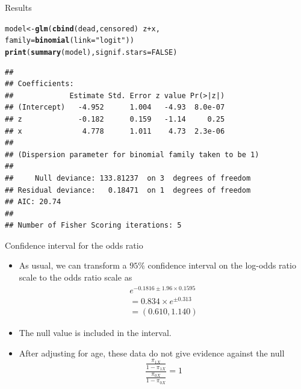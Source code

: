 \documentclass[10pt]{beamer}\usepackage[]{graphicx}\usepackage[]{color}
\makeatletter
\newcommand{\hlnum}[1]{\textcolor[rgb]{0.686,0.059,0.569}{#1}}%
\newcommand{\hlstr}[1]{\textcolor[rgb]{0.192,0.494,0.8}{#1}}%
\newcommand{\hlopt}[1]{\textcolor[rgb]{0,0,0}{#1}}%
\newcommand{\hlstd}[1]{\textcolor[rgb]{0.345,0.345,0.345}{#1}}%
\newcommand{\hlkwb}[1]{\textcolor[rgb]{0.69,0.353,0.396}{#1}}%
\newcommand{\hlkwc}[1]{\textcolor[rgb]{0.333,0.667,0.333}{#1}}%
\newcommand{\hlkwd}[1]{\textcolor[rgb]{0.737,0.353,0.396}{\textbf{#1}}}%
\newenvironment{kframe}{%
 \def\at@end@of@kframe{}%
 \ifinner\ifhmode%
  \def\at@end@of@kframe{\end{minipage}}%
  \begin{minipage}{\columnwidth}%
 \fi\fi%
 \def\FrameCommand##1{\hskip\@totalleftmargin \hskip-\fboxsep
 \colorbox{shadecolor}{##1}\hskip-\fboxsep
     \hskip-\linewidth \hskip-\@totalleftmargin \hskip\columnwidth}%
 \MakeFramed {\advance\hsize-\width
   \@totalleftmargin\z@ \linewidth\hsize
   \@setminipage}}%
 {\par\unskip\endMakeFramed%
 \at@end@of@kframe}
\newenvironment{knitrout}{}{} %
\makeatother
\begin{document}
\begin{frame}[fragile]{Results}
\begin{knitrout}
\color{fgcolor}\begin{kframe}
\begin{alltt}
\hlstd{model} \hlkwb{<-} \hlkwd{glm}\hlstd{(}\hlkwd{cbind}\hlstd{(dead,censored)} \hlopt{~} \hlstd{z} \hlopt{+} \hlstd{x,}
              \hlkwc{family}\hlstd{=}\hlkwd{binomial}\hlstd{(}\hlkwc{link}\hlstd{=}\hlstr{"logit"}\hlstd{))}
\hlkwd{print}\hlstd{(}\hlkwd{summary}\hlstd{(model),} \hlkwc{signif.stars} \hlstd{=} \hlnum{FALSE}\hlstd{)}
\end{alltt}
\begin{verbatim}
## 
## Coefficients:
##             Estimate Std. Error z value Pr(>|z|)
## (Intercept)   -4.952      1.004   -4.93  8.0e-07
## z             -0.182      0.159   -1.14     0.25
## x              4.778      1.011    4.73  2.3e-06
## 
## (Dispersion parameter for binomial family taken to be 1)
## 
##     Null deviance: 133.81237  on 3  degrees of freedom
## Residual deviance:   0.18471  on 1  degrees of freedom
## AIC: 20.74
## 
## Number of Fisher Scoring iterations: 5
\end{verbatim}
\end{kframe}
\end{knitrout}
\end{frame}



\begin{frame}[fragile]{Confidence interval for the odds ratio}
	\begin{itemize}
		\item As usual, we can transform a $95 \%$ confidence interval on the log-odds ratio scale to the odds ratio scale as
		$$
		\begin{array}{l}
		e^{-0.1816 \pm 1.96 \times 0.1595} \\
		=0.834 \times e^{\pm 0.313} \\
		=(0.610,1.140)
		\end{array}
		$$
		\item The null value is included in the interval.
		\item After adjusting for age, these data do not give evidence against the null
		$$
		\frac{\frac{\pi_{1 X}}{1-\pi_{1 X}}}{\frac{\pi_{0 X}}{1-\pi_{0 X}}}=1
		$$
	\end{itemize}
\end{frame}
\end{document}
